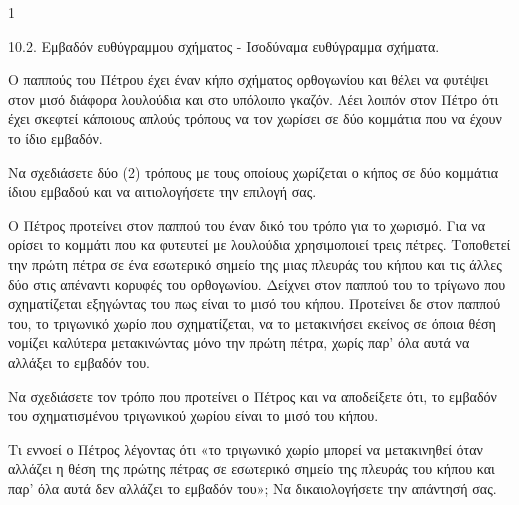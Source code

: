 \begin{ylh}{1}
\item 10.2. Εμβαδόν ευθύγραμμου σχήματος - Ισοδύναμα ευθύγραμμα σχήματα.
\end{ylh}


Ο παππούς του Πέτρου έχει έναν κήπο σχήματος ορθογωνίου και θέλει να φυτέψει στον
μισό διάφορα λουλούδια και στο υπόλοιπο γκαζόν. Λέει λοιπόν στον Πέτρο ότι έχει
σκεφτεί κάποιους απλούς τρόπους να τον χωρίσει σε δύο κομμάτια που να έχουν το ίδιο εμβαδόν.
\begin{alist}
\item Να σχεδιάσετε δύο (2) τρόπους με τους οποίους χωρίζεται ο κήπος σε δύο κομμάτια
ίδιου εμβαδού και να αιτιολογήσετε την επιλογή σας.
\item Ο Πέτρος προτείνει στον παππού του έναν δικό του τρόπο για το χωρισμό. Για να
ορίσει το κομμάτι που κα φυτευτεί με λουλούδια χρησιμοποιεί τρεις πέτρες. Τοποθετεί την πρώτη πέτρα σε ένα εσωτερικό σημείο της μιας πλευράς του κήπου και τις άλλες δύο
στις απέναντι κορυφές του ορθογωνίου. Δείχνει στον παππού του το τρίγωνο που
σχηματίζεται εξηγώντας του πως είναι το μισό του κήπου. Προτείνει δε στον παππού του,
το τριγωνικό χωρίο που σχηματίζεται, να το μετακινήσει εκείνος σε όποια θέση νομίζει καλύτερα μετακινώντας μόνο την πρώτη πέτρα, χωρίς παρ’ όλα αυτά να αλλάξει το
εμβαδόν του.
\begin{rlist}
\item Να σχεδιάσετε τον τρόπο που προτείνει ο Πέτρος και να αποδείξετε ότι, το
εμβαδόν του σχηματισμένου τριγωνικού χωρίου είναι το μισό του κήπου.
\item Τι εννοεί ο Πέτρος λέγοντας ότι «το τριγωνικό χωρίο μπορεί να μετακινηθεί όταν
αλλάζει η θέση της πρώτης πέτρας σε εσωτερικό σημείο της πλευράς του κήπου
και παρ’ όλα αυτά δεν αλλάζει το εμβαδόν του»; Να δικαιολογήσετε την απάντησή
σας.
\end{rlist}
\end{alist}